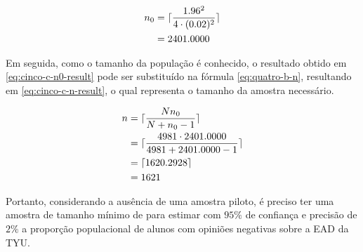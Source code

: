 	\begin{align}
		n_0 
			&= \lceil \frac{1.96^2}{4 \cdot (0.02)^2} \nonumber \rceil \\
			&= \label{eq:cinco-c-n0-result}
			   2401.0000
	\end{align}

	Em seguida, como o tamanho da população é conhecido, o resultado obtido
	em \eqref{eq:cinco-c-n0-result} pode ser substituído na fórmula
	\eqref{eq:quatro-b-n}, resultando em \eqref{eq:cinco-c-n-result}, o qual
	representa o tamanho da amostra necessário.

	\begin{align}
		n &= \lceil \frac{N n_0}{N + n_0 - 1} \nonumber \rceil \\
		  &= \lceil \frac{4981 \cdot 2401.0000}{4981 + 2401.0000 - 1}
		  \nonumber \rceil \\
		  &= \lceil 1620.2928 \nonumber \rceil\\
		  &= \label{eq:cinco-c-n-result} 
			 1621
	\end{align}

	Portanto, considerando a ausência de uma amostra piloto, é preciso ter
	uma amostra de tamanho mínimo de \CINCOCnceil para estimar com $95\%$ de
	confiança e precisão de $2\%$ a proporção populacional de alunos com
	opiniões negativas sobre a EAD da TYU.
